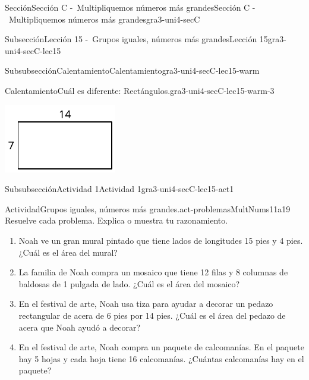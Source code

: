 \documentclass[twoside,10pt,]{article}
\begin{document}
\begin{sectionptx}{Sección}{Sección C -~Multipliquemos números más grandes}{}{Sección C -~Multipliquemos números más grandes}{}{}{gra3-uni4-secC}
\begin{subsectionptx}{Subsección}{Lección 15 -~Grupos iguales, números más grandes}{}{Lección 15}{}{}{gra3-uni4-secC-lec15}
\begin{subsubsectionptx}{Subsubsección}{Calentamiento}{}{Calentamiento}{}{}{gra3-uni4-secC-lec15-warm}
\begin{exploration}{Calentamiento}{Cuál es diferente: Rectángulos.}{gra3-uni4-secC-lec15-warm-3}
\begin{sidebyside}{2}{0}{0}{0}
\begin{sbspanel}{0.5}
\includegraphics[width=\linewidth]{external/svg-source/tikz-file-149353.pdf}
\end{sbspanel}%
\end{sidebyside}%
\end{exploration}%
\end{subsubsectionptx}
%
%
\typeout{************************************************}
\typeout{************************************************}
%
\begin{subsubsectionptx}{Subsubsección}{Actividad 1}{}{Actividad 1}{}{}{gra3-uni4-secC-lec15-act1}
\begin{activity}{Actividad}{Grupos iguales, números más grandes.}{act-problemasMultNums11a19}%
Resuelve cada problema. Explica o muestra tu razonamiento.%
%
\begin{enumerate}
\item{}Noah ve un gran mural pintado que tiene lados de longitudes 15 pies y 4 pies. ¿Cuál es el área del mural?%
\item{}La familia de Noah compra un mosaico que tiene 12 filas y 8 columnas de baldosas de 1 pulgada de lado. ¿Cuál es el área del mosaico?%
\item{}En el festival de arte, Noah usa tiza para ayudar a decorar un pedazo rectangular de acera de 6 pies por 14 pies. ¿Cuál es el área del pedazo de acera que Noah ayudó a decorar?%
\item{}En el festival de arte, Noah compra un paquete de calcomanías. En el paquete hay 5 hojas y cada hoja tiene 16 calcomanías. ¿Cuántas calcomanías hay en el paquete?%
\end{enumerate}
\end{activity}%
\end{subsubsectionptx}
%
%
\typeout{************************************************}

\end{subsectionptx}
\end{sectionptx}
\end{document}
